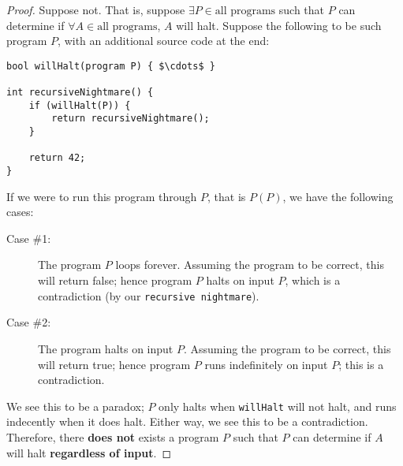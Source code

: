\documentclass[12pt]{article}
\begin{document}
\begin{proof}
Suppose not. That is, suppose $\exists P \in \text{all programs}$ such that $P$ can determine if $\forall A \in \text{all programs}$, $A$ will halt. Suppose the following to be such program $P$, with an additional source code at the end:

\begin{lstlisting}[mathescape]
bool willHalt(program P) { $\cdots$ }

int recursiveNightmare() {
    if (willHalt(P)) {
        return recursiveNightmare();
    }

    return 42;
}

\end{lstlisting}

If we were to run this program through $P$, that is $P(P)$, we have the following cases:

\begin{description}
    \item [Case \#1:] The program $P$ loops forever. Assuming the program to be correct, this will return false; hence program $P$ halts on input $P$, which is a contradiction (by our \texttt{recursive nightmare}).
    \item [Case \#2:] The program halts on input $P$. Assuming the program to be correct, this will return true; hence program $P$ runs indefinitely on input $P$; this is a contradiction.
\end{description}

We see this to be a paradox; $P$ only halts when \texttt{willHalt} will not halt, and runs indecently when it does halt. Either way, we see this to be a contradiction. Therefore, there \textbf{does not} exists a program $P$ such that $P$ can determine if $A$ will halt \textbf{regardless of input}.

\end{proof}
\end{document}
